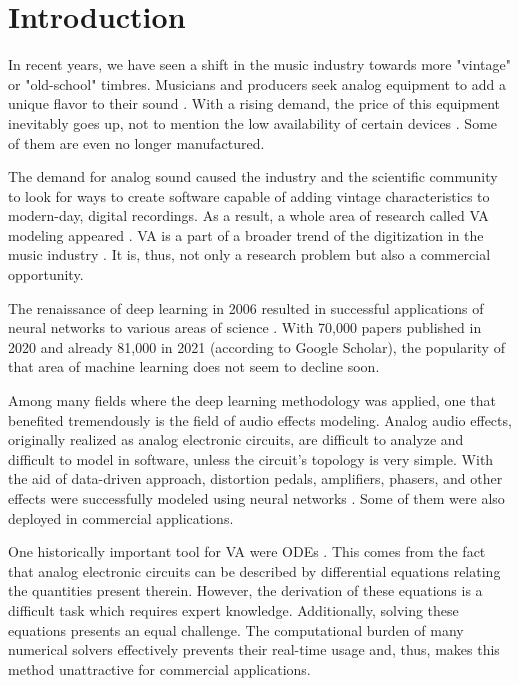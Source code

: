\chapter{Introduction}
\label{chap:Introduction}

In recent years, we have seen a shift in the music industry towards more "vintage" or "old-school" timbres. Musicians and producers seek analog equipment to add a unique flavor to their sound \cite{Parker2013,Stilson2006,DAngelo2014}. With a rising demand, the price of this equipment inevitably goes up, not to mention the low availability of certain devices \cite{Kiiski2016}. Some of them are even no longer manufactured.

The demand for analog sound caused the industry and the scientific community to look for ways to create software capable of adding vintage characteristics to modern-day, digital recordings. As a result, a whole area of research called \ac{VA} modeling appeared \cite{Parker2013,Stilson2006,DAngelo2014,Werner2016}. \ac{VA} is a part of a broader trend of the digitization in the music industry \cite{Zoelzer2011,Valimaki2010}. It is, thus, not only a research problem but also a commercial opportunity.

The renaissance of deep learning in 2006 resulted in successful applications of neural networks to various areas of science \cite{Goodfellow-et-al-2016}. With 70,000 papers published in 2020 and already 81,000 in 2021 (according to Google Scholar), the popularity of that area of machine learning does not seem to decline soon.

Among many fields where the deep learning methodology was applied, one that benefited tremendously is the field of audio effects modeling. Analog audio effects, originally realized as analog electronic circuits, are difficult to analyze and difficult to model in software, unless the circuit's topology is very simple. With the aid of data-driven approach, distortion pedals, amplifiers, phasers, and other effects were successfully modeled using neural networks \cite{Parker2019,Wright2019,Wright2019a,Wright2020}. Some of them were also deployed in commercial applications.

One historically important tool for \ac{VA} were \acfp{ODE} \cite{Yeh2007,Yeh2008}. This comes from the fact that analog electronic circuits can be described by differential equations relating the quantities present therein. However, the derivation of these equations is a difficult task which requires expert knowledge. Additionally, solving these equations presents an equal challenge. The computational burden of many numerical solvers effectively prevents their real-time usage and, thus, makes this method unattractive for commercial applications.

